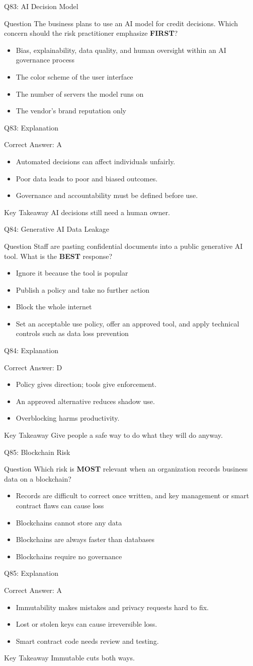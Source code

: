 \documentclass[aspectratio=169]{beamer}
\newcommand{\hq}[7]{%
	\begin{frame}{Q#1: #2}
		\begin{block}{Question}
			#3
		\end{block}
		\begin{itemize}
			#4
		\end{itemize}
	\end{frame}
	\begin{frame}{Q#1: Explanation}
		\begin{block}{Correct Answer: #5}
			\begin{itemize}
				#6
			\end{itemize}
		\end{block}
		\begin{alertblock}{Key Takeaway}
			#7
		\end{alertblock}
	\end{frame}
}
\begin{document}
	\hq{83}{AI Decision Model}
	{The business plans to use an AI model for credit decisions. Which concern should the risk practitioner emphasize \textbf{FIRST}?}
	{\item[\textbf{(A)}] Bias, explainability, data quality, and human oversight within an AI governance process
		\item[\textbf{(B)}] The color scheme of the user interface
		\item[\textbf{(C)}] The number of servers the model runs on
		\item[\textbf{(D)}] The vendor's brand reputation only}
	{A}
	{\item Automated decisions can affect individuals unfairly.
		\item Poor data leads to poor and biased outcomes.
		\item Governance and accountability must be defined before use.}
	{AI decisions still need a human owner.}
	
	\hq{84}{Generative AI Data Leakage}
	{Staff are pasting confidential documents into a public generative AI tool. What is the \textbf{BEST} response?}
	{\item[\textbf{(A)}] Ignore it because the tool is popular
		\item[\textbf{(B)}] Publish a policy and take no further action
		\item[\textbf{(C)}] Block the whole internet
		\item[\textbf{(D)}] Set an acceptable use policy, offer an approved tool, and apply technical controls such as data loss prevention}
	{D}
	{\item Policy gives direction; tools give enforcement.
		\item An approved alternative reduces shadow use.
		\item Overblocking harms productivity.}
	{Give people a safe way to do what they will do anyway.}
	
	\hq{85}{Blockchain Risk}
	{Which risk is \textbf{MOST} relevant when an organization records business data on a blockchain?}
	{\item[\textbf{(A)}] Records are difficult to correct once written, and key management or smart contract flaws can cause loss
		\item[\textbf{(B)}] Blockchains cannot store any data
		\item[\textbf{(C)}] Blockchains are always faster than databases
		\item[\textbf{(D)}] Blockchains require no governance}
	{A}
	{\item Immutability makes mistakes and privacy requests hard to fix.
		\item Lost or stolen keys can cause irreversible loss.
		\item Smart contract code needs review and testing.}
	{Immutable cuts both ways.}
	
\end{document}

